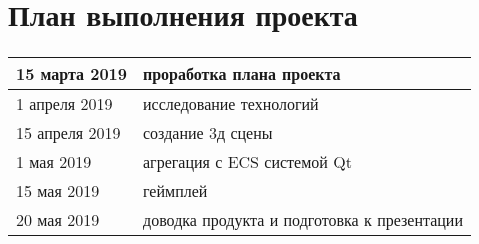 \section{План выполнения проекта}

\begin{frame}
    \frametitle{\insertsection} 
    \begin{tabular}{|l|l|}
        \hline
        15 марта 2019 & проработка плана проекта \\
        \hline
        1 апреля 2019 &  исследование технологий \\
        \hline
        15 апреля 2019 & создание 3д сцены \\
        \hline
        1 мая 2019 & агрегация с ECS системой Qt \\
        \hline
        15 мая 2019 & геймплей \\
        \hline
        20 мая 2019 & доводка продукта и подготовка к презентации \\
        \hline
    \end{tabular}
\end{frame}
